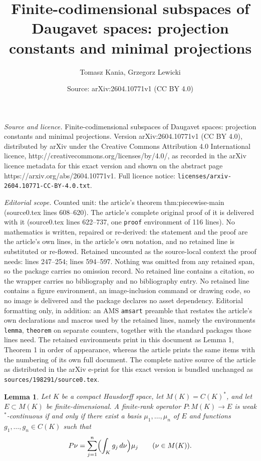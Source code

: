 \documentclass[10pt,a4paper]{amsart}
\title{Finite-codimensional subspaces of Daugavet spaces: projection constants and minimal projections}
\author{Tomasz Kania, Grzegorz Lewicki}
\date{Source: arXiv:2604.10771v1 (CC BY 4.0)}
\newtheorem{lemma}{Lemma}
\begin{document}
\maketitle

\noindent\emph{Source and licence.} Finite-codimensional subspaces of Daugavet spaces: projection constants and minimal projections. Version arXiv:2604.10771v1 (CC BY 4.0), distributed by arXiv under the Creative Commons Attribution 4.0 International licence, http://creativecommons.org/licenses/by/4.0/, as recorded in the arXiv licence metadata for this exact version and shown on the abstract page https://arxiv.org/abs/2604.10771v1. Full licence notice: \texttt{licenses/arxiv-2604.10771-CC-BY-4.0.txt}.\par\smallskip

\noindent\textit{Editorial scope.} Counted unit: the article's theorem thm:piecewise-main (source0.tex lines 608--620). The article's complete original proof of it is delivered with it (source0.tex lines 622--737, one \texttt{proof} environment of 116 lines). No mathematics is written, repaired or re-derived: the statement and the proof are the article's own lines, in the article's own notation, and no retained line is substituted or re-flowed.  Retained uncounted as the source-local context the proof needs: lines 247--254; lines 594--597.  Nothing was omitted from any retained span, so the package carries no omission record.  No retained line contains a citation, so the wrapper carries no bibliography and no bibliography entry.  No retained line contains a figure environment, an image-inclusion command or drawing code, so no image is delivered and the package declares no asset dependency.  Editorial formatting only, in addition: an AMS \texttt{amsart} preamble that restates the article's own declarations and macros used by the retained lines, namely the environments \texttt{lemma}, \texttt{theorem} on separate counters, together with the standard packages those lines need.  The retained environments print in this document as Lemma 1, Theorem 1 in order of appearance, whereas the article prints the same items with the numbering of its own full document.  The complete native source of the article as distributed in the arXiv e-print for this exact version is bundled unchanged as \texttt{sources/198291/source0.tex}.
\begin{lemma}
\label{lem:wstar-coded}
Let $K$ be a compact Hausdorff space, let $M(K)=C(K)^*$, and let $E\subset M(K)$ be finite-dimensional. A finite-rank operator $P\colon M(K)\to E$ is weak$^*$-continuous if and only if there exist a basis $\mu_1,\dots,\mu_n$ of $E$ and functions $g_1,\dots,g_n\in C(K)$ such that
\[
P\nu = \sum_{j=1}^n \Bigl(\int_K g_j\, d\nu\Bigr)\mu_j
\qquad (\nu\in M(K)).
\]
\end{lemma}
\end{document}
